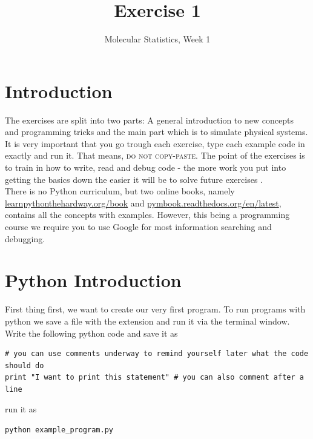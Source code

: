 \documentclass{article}
\title{Exercise 1}
\author{Molecular Statistics, Week 1}
\date{}
\begin{document}

\maketitle

\section*{Introduction}

The exercises are split into two parts: A general introduction to new concepts and programming tricks and the main part which is to simulate physical systems.
It is very important that you go trough each exercise, type each example code in exactly and run it.
That means, \textsc{do not copy-paste}.
The point of the exercises is to train in how to write, read and debug code - the more work you put into getting the basics down the easier it will be to solve future exercises .\\


There is no Python curriculum, but two online books, namely
\href{http://learnpythonthehardway.org/book/}{learnpythonthehardway.org/book} and
\href{http://pymbook.readthedocs.org/en/latest/}{pymbook.readthedocs.org/en/latest},
contains all the concepts with examples.
However, this being a programming course we require you to use Google for most information searching and debugging.

\section{Python Introduction}

First thing first, we want to create our very first program.
To run programs with python we save a file with the extension  and run it via the terminal window.
Write the following python code and save it as 

\begin{lstlisting}
# you can use comments underway to remind yourself later what the code should do
print "I want to print this statement" # you can also comment after a line
\end{lstlisting}

run it as

\begin{lstlisting}
python example_program.py
\end{lstlisting}
\end{document}
